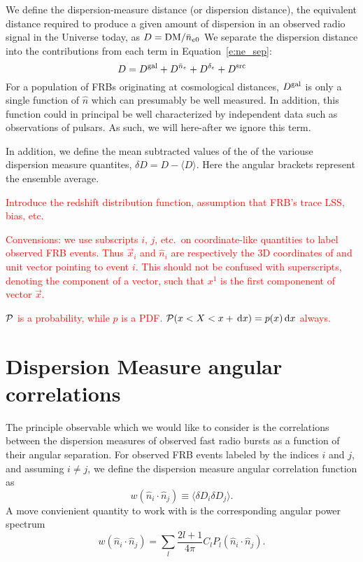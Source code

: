 \documentclass[onecolumn,prd,noshowpacs,nofootinbib,amsmath,amssymb]{revtex4}
\newcommand{\Dgal}{D^{\rm gal}}
\newcommand{\Dne}{D^{\bar{n}_e}}
\newcommand{\Dde}{D^{\delta_e}}
\newcommand{\Dsrc}{D^{\rm src}}
\newcommand{\del}{\delta\!}
\newcommand{\calP}{{\cal P}}
\newcommand{\ud}{\,\mathrm{d}}
\newcommand{\red}{\textcolor{red}}
\begin{document}
We define the dispersion-measure distance (or dispersion distance),
the equivalent distance required to
produce a given amount of dispersion in an observed radio signal in the
Universe today, as $ D = {{\rm DM}}/{\bar{n}_{e0}}$
We separate the dispersion distance into the contributions from each
term in Equation~\ref{e:ne_sep}:
\begin{equation}
\label{e:D_sep}
D = \Dgal + \Dne + \Dde + \Dsrc
\end{equation}
For a population of FRBs originating at cosmological distances, $\Dgal$
is only a single function of $\hat{n}$ which can presumably be well
measured.  In addition, this function could in principal be well characterized
by independent data such as observations of pulsars.  As such, we will
here-after we ignore this term.

In addition, we define the mean subtracted values of the of the variouse dispersion
measure quantites, $\del D = D - \langle D \rangle$. Here the angular brackets represent
the ensemble average.

\red{Introduce the redshift distribution function, assumption that FRB's trace
LSS, bias, etc.}

\red{Convensions: we use subscripts $i$, $j$, etc.~on coordinate-like
    quantities to label observed FRB events. Thus $\vec x_i$ and $\hat{n}_i$
    are respectively the 3D coordinates of and unit vector pointing to event $i$.
    This should not be confused with superscripts, denoting the
component of a vector, such that $x^1$ is the first componenent of vector $\vec
x$.  }

\red{$\calP$ is a probability, while $p$ is a PDF. $\calP(x < X < x + \ud x) =
p(x) \ud x$ always.}


\section{Dispersion Measure angular correlations}

The principle observable which we would like to consider is the correlations
between the dispersion measures of observed fast radio bursts as a function of
their angular separation.  For observed FRB events labeled by the indices $i$
and $j$, and assuming $i \neq j$, we define the dispersion measure angular
correlation function as
\begin{equation}
    w(\hat{n}_i\cdot\hat{n}_j) \equiv \langle \del D_i \del D_j \rangle.
\end{equation}
A move convienient quantity to work with is the corresponding angular
power spectrum
\begin{equation}
w(\hat{n}_i \cdot\hat{n}_j) = \sum_l \frac{2l+1}{4 \pi} C_l
P_l(\hat{n}_i\cdot\hat{n}_j).
\end{equation}
\end{document}
